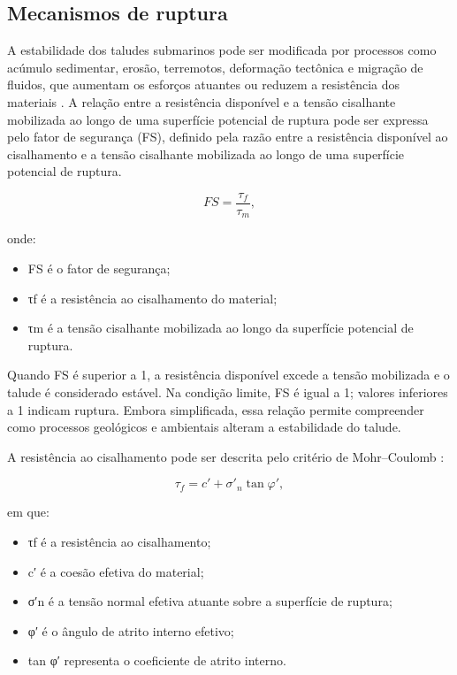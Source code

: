 \subsection{Mecanismos de ruptura}\label{sec:2-3-1}

A estabilidade dos taludes submarinos pode ser modificada por processos como acúmulo sedimentar, erosão, terremotos, deformação tectônica e migração de fluidos, que aumentam os esforços atuantes ou reduzem a resistência dos materiais \cite{hampton1996}. A relação entre a resistência disponível e a tensão cisalhante mobilizada ao longo de uma superfície potencial de ruptura pode ser expressa pelo fator de segurança (FS), definido pela razão entre a resistência disponível ao cisalhamento e a tensão cisalhante mobilizada ao longo de uma superfície potencial de ruptura.

\begin{equation}
  FS=\frac{\tau_f}{\tau_m},
  \label{eq:fator-seguranca}
\end{equation}

\noindent
onde:

\begin{itemize}
  \item FS é o fator de segurança;
  \item τf é a resistência ao cisalhamento do material;
  \item τm é a tensão cisalhante mobilizada ao longo da superfície potencial de ruptura.
\end{itemize}

Quando FS é superior a 1, a resistência disponível excede a tensão mobilizada e o talude é considerado estável. Na condição limite, FS é igual a 1; valores inferiores a 1 indicam ruptura. Embora simplificada, essa relação permite compreender como processos geológicos e ambientais alteram a estabilidade do talude.

A resistência ao cisalhamento pode ser descrita pelo critério de Mohr--Coulomb \cite{caputo1988}:

\begin{equation}
  \tau_f=c'+\sigma'_n\tan\varphi',
  \label{eq:mohr-coulomb}
\end{equation}

\noindent
em que:

\begin{itemize}
  \item τf é a resistência ao cisalhamento;
  \item c′ é a coesão efetiva do material;
  \item σ′n é a tensão normal efetiva atuante sobre a superfície de ruptura;
  \item φ′ é o ângulo de atrito interno efetivo;
  \item tan φ′ representa o coeficiente de atrito interno.
\end{itemize}

